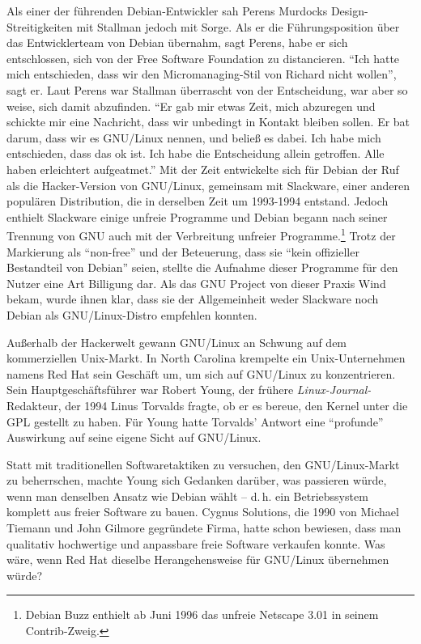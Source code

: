 Als einer der führenden Debian-Entwickler sah Perens Murdocks Design-Streitigkeiten mit Stallman jedoch mit Sorge. Als er die Führungsposition über das Entwicklerteam von Debian übernahm, sagt Perens, habe er sich entschlossen, sich von der Free Software Foundation zu distancieren. "`Ich hatte mich entschieden, dass wir den Micromanaging-Stil von Richard nicht wollen"', sagt er.
Laut Perens war Stallman überrascht von der Entscheidung, war aber so weise, sich damit abzufinden. "`Er gab mir etwas Zeit, mich abzuregen und schickte mir eine Nachricht, dass wir unbedingt in Kontakt bleiben sollen. Er bat darum, dass wir es GNU/Linux nennen, und beließ es dabei. Ich habe mich entschieden, dass das ok ist. Ich habe die Entscheidung allein getroffen. Alle haben erleichtert aufgeatmet."'
Mit der Zeit entwickelte sich für Debian der Ruf als die Hacker-Version von GNU/Linux, gemeinsam mit Slackware, einer anderen populären Distribution, die in derselben Zeit um 1993-1994 entstand. Jedoch enthielt Slackware einige unfreie Programme und Debian begann nach seiner Trennung von GNU auch mit der Verbreitung unfreier Programme.\footnote{Debian Buzz enthielt ab Juni 1996 das unfreie Netscape 3.01 in seinem Contrib-Zweig.} Trotz der Markierung als "`non-free"' und der Beteuerung, dass sie "`kein offizieller Bestandteil von Debian"' seien, stellte die Aufnahme dieser Programme für den Nutzer eine Art Billigung dar. Als das GNU Project von dieser Praxis Wind bekam, wurde ihnen klar, dass sie der Allgemeinheit weder Slackware noch Debian als GNU/Linux-Distro empfehlen konnten.

Außerhalb der Hackerwelt gewann GNU/Linux an Schwung auf dem kommerziellen Unix-Markt. In North Carolina krempelte ein Unix-Unternehmen namens Red Hat sein Geschäft um, um sich auf GNU/Linux zu konzentrieren. Sein Hauptgeschäftsführer war Robert Young, der frühere \textit{Linux-Journal-}Redakteur, der 1994 Linus Torvalds fragte, ob er es bereue, den Kernel unter die GPL gestellt zu haben. Für Young hatte Torvalds' Antwort eine "`profunde"' Auswirkung auf seine eigene Sicht auf GNU/Linux.

Statt mit traditionellen Softwaretaktiken zu versuchen, den GNU/Linux-Markt zu beherrschen, machte Young sich Gedanken darüber, was passieren würde, wenn man denselben Ansatz wie Debian wählt – d.\,h. ein Betriebssystem komplett aus freier Software zu bauen. Cygnus Solutions, die 1990 von Michael Tiemann und John Gilmore gegründete Firma, hatte schon bewiesen, dass man qualitativ hochwertige und anpassbare freie Software verkaufen konnte. Was wäre, wenn Red Hat dieselbe Herangehensweise für GNU/Linux übernehmen würde?

